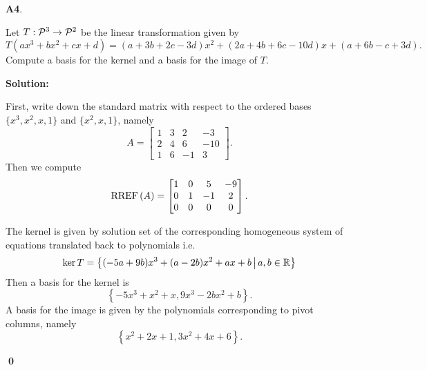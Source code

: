\documentclass{article}
\newenvironment{problem}[1]
{
  \begin{flushleft}
  \textbf{#1}.
  \ignorespaces
}
{
  \end{flushleft}
}
\newenvironment{solution}
{
  \ignorespaces
  \textbf{Solution:}
}
{
  \ignorespacesafterend
  \begin{flushright}
  {\bfseries \qed}
  \end{flushright}
}
\begin{document}
\begin{problem}{A4}
Let $T: \P^3 \rightarrow \P^2$ be the linear transformation given by 
\[T\left( ax^3+bx^2+cx+d \right)  = (a+3b+2c-3d)x^2 + (2a+4b+6c-10d)x+  (a+6b-c+3d).\]
Compute a basis for the kernel and a basis for the image of $T$.
\end{problem}
\begin{solution}
First, write down the standard matrix with respect to the ordered bases \(\{x^3,x^2,x,1\} \) and \(\{x^2,x,1\}\), namely \[A=\begin{bmatrix}1 & 3 & 2 & -3 \\ 2 & 4 & 6 & -10 \\ 1 & 6 & -1 & 3 \end{bmatrix}.\]
Then we compute
\[\RREF\left(A\right) = \begin{bmatrix} 1 & 0 & 5 & -9 \\ 0 & 1 & -1 & 2 \\ 0 & 0 & 0 & 0\end{bmatrix}.\]

The kernel is given by solution set of the corresponding homogeneous system of equations translated back to polynomials i.e. 
\[ \ker T = \setBuilder{  (-5a+9b)x^3 + (a-2b)x^2 + ax + b }{a,b \in \IR} \]
Then a basis for the kernel is
$$\left\{ -5x^3+x^2+x, 9x^3-2bx^2+b \right\}.$$
A basis for the image is given by the polynomials corresponding to pivot columns, namely
$$\left\{  x^2+2x+1, 3x^2+4x+6\right\}. $$
\end{solution}
\end{document}
